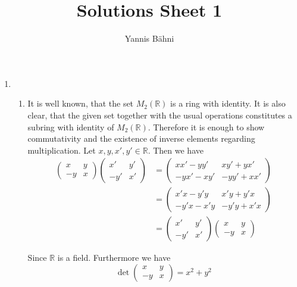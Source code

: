 

\title{Solutions Sheet 1}
\author{Yannis B\"{a}hni}
\address[Yannis B\"{a}hni]{University of Zurich, R\"{a}mistrasse 71, 8006 Zurich}


\maketitle
\thispagestyle{fancy}
\begin{enumerate}[label = \textbf{Exercise \arabic*.},wide = 0pt, itemsep=1.5ex]
\item
	~ 
	\begin{enumerate}[label = \alph*),wide = 0pt, itemsep=1.5ex]
		\item It is well known, that the set $M_2(\mathbb{R})$ is a ring with identity. It is also clear, that the given set together with the usual operations constitutes a subring with identity of $M_2(\mathbb{R})$. Therefore it is enough to show commutativity and the existence of inverse elements regarding multiplication. Let $x,y,x',y' \in \mathbb{R}$. Then we have
\begin{align*}
	\begin{pmatrix}
		x & y\\
		-y & x
	\end{pmatrix}
	\begin{pmatrix}
		x' & y'\\
		-y' & x'
	\end{pmatrix}
	&= \begin{pmatrix}
		xx' -yy' & xy'+yx'\\
		-yx'-xy' & -yy'+xx'
	\end{pmatrix}\\
	&= \begin{pmatrix}
		x'x-y'y & x'y +y'x\\
		-y'x-x'y & -y'y+x'x
	\end{pmatrix}\\
	&= \begin{pmatrix}
		x' & y'\\
		-y' & x'
	\end{pmatrix}
	\begin{pmatrix}
		x & y\\
		-y & x
	\end{pmatrix}
\end{align*}

Since $\mathbb{R}$ is a field. Furthermore we have
\begin{equation}
	\det\begin{pmatrix}
		x & y\\
		-y & x
	\end{pmatrix} = x^2 + y^2
\end{equation}


\end{enumerate}
\end{enumerate}
